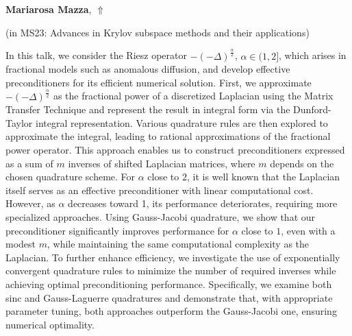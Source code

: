 \documentclass[ILAS2025-program.tex]{subfiles}
\begin{document}
\hypertarget{down0194}{}\begin{ilasabstract}
    
\textbf{Mariarosa Mazza},  \hfill \hyperlink{up0194}{$\Uparrow$}
    
    
(in {\color{mstitle}MS23: Advances in Krylov subspace methods and their applications})
        
\mtskip
    In this talk, we consider the Riesz operator \( -(- \Delta)^{\frac{\alpha}{2}} \), \(\alpha \in (1, 2]\), which arises in fractional models such as anomalous diffusion, and develop effective preconditioners for its efficient numerical solution. First, we approximate \( -(-\Delta)^{\frac{\alpha}{2}} \) as the fractional power of a discretized Laplacian using the Matrix Transfer Technique and represent the result in integral form via the Dunford-Taylor integral representation. Various quadrature rules are then explored to approximate the integral, leading to rational approximations of the fractional power operator.  
This approach enables us to construct preconditioners expressed as a sum of \( m \) inverses of shifted Laplacian matrices, where \( m \) depends on the chosen quadrature scheme. For \(\alpha\) close to $2$, it is well known that the Laplacian itself serves as an effective preconditioner with linear computational cost. However, as \(\alpha\) decreases toward 1, its performance deteriorates, requiring more specialized approaches. Using Gauss-Jacobi quadrature, we show that our preconditioner significantly improves performance for \(\alpha\) close to $1$, even with a modest \( m \), while maintaining the same computational complexity as the Laplacian.  
To further enhance efficiency, we investigate the use of exponentially convergent quadrature rules to minimize the number of required inverses while achieving optimal preconditioning performance. Specifically, we examine both sinc and Gauss-Laguerre quadratures and demonstrate that, with appropriate parameter tuning, both approaches outperform the Gauss-Jacobi one, ensuring numerical optimality.
\end{ilasabstract}
    
\end{document}
